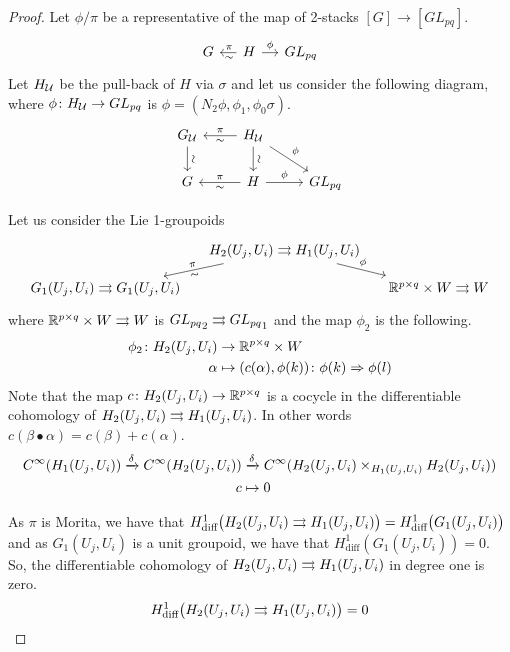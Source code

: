 \begin{proof}
Let $\phi/\pi$ be a representative of the map of 2-stacks $[G]\to [GL_{pq}]$.
\begin{equation}
\begin{tikzcd}[sep = small]
  G & H \ar{l}[pos=.45, above]{\pi}[pos=.45, below]{\sim} \ar{r}{\phi} & GL_{pq}
\end{tikzcd}
\end{equation}
Let $H_{\mathcal{U}}$ be the pull-back of $H$ via $\sigma$ and let us consider the following diagram, where $\phi\colon H_{\mathcal{U}}\to GL_{pq}$ is $\phi=(N_2\phi,\phi_1,\phi_0\sigma)$.
\begin{equation}
\begin{tikzcd}
  G_\U \ar{d}[sloped]{\sim} & H_\U \ar{l}[below]{\sim}[above]{\pi} \ar{d}[sloped]{\sim} \ar{dr}{\phi} \\
  G & H \ar{l}[below]{\sim}[above]{\pi} \ar{r}[above]{\phi} & GL_{pq}
\end{tikzcd}
\end{equation}

Let us consider the Lie 1-groupoids
\begin{equation}
\begin{tikzcd}[sep = small]
  & H_2(U_j,U_i)\tto H_1(U_j,U_i) \ar{dl}[sloped, below]{\sim}[sloped, above]{\pi} \ar{dr}[sloped]{\phi} \\
  G_1(U_j,U_i)\tto G_1(U_j,U_i) &  & \RR^{p\times q}\times W \tto W
\end{tikzcd}
\end{equation}
where $\mathbb{R}^{p\times q}\times W \rightrightarrows W$ is ${GL_{pq}}_2 \rightrightarrows {GL_{pq}}_1$ and the map $\phi_2$ is the following.
\begin{align}
  \phi_2\colon H_2(U_j,U_i) &\to \mathbb{R}^{p\times q}\times W \\
  \alpha &\mapsto (c(\alpha), \phi(k))\colon\phi(k)\Rightarrow\phi(l)
\end{align}
Note that the map $c\colon H_2(U_j,U_i)\to\mathbb{R}^{p\times q}$ is a cocycle in the differentiable cohomology of $H_2(U_j,U_i)\rightrightarrows H_1(U_j,U_i)$.
In other words $c(\beta\bullet\alpha) = c(\beta) + c(\alpha)$.
\begin{align}
  C^\infty(H_1(U_j,U_i)) \xrightarrow{\delta} C^\infty(H_2(U_j,U_i)) &\xrightarrow{\delta} C^\infty(H_2(U_j,U_i) \times_{H_1(U_j,U_i)} H_2(U_j,U_i)) \\
  c &\mapsto 0
\end{align}

As $\pi$ is Morita, we have that $H^1_\text{diff}\big(H_2(U_j,U_i)\rightrightarrows H_1(U_j,U_i)\big) = H^1_\text{diff}\big(G_1(U_j,U_i)\big)$ and as $G_1(U_j,U_i)$ is a unit groupoid, we have that $H^1_\text{diff}(G_1(U_j,U_i)) = 0$.
So, the differentiable cohomology of $H_2(U_j,U_i)\rightrightarrows H_1(U_j,U_i)$ in degree one is zero.
\[ H^1_\text{diff}\big(H_2(U_j,U_i)\rightrightarrows H_1(U_j,U_i)\big) = 0 \]


\end{proof}
